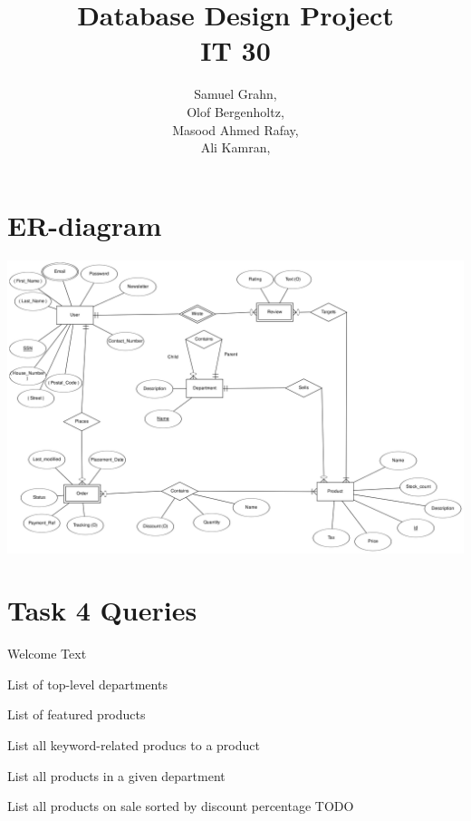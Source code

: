 \documentclass{article}
\title{
  Database Design Project\\
  IT 30
}
\author{
  Samuel Grahn, \email{samuel.grahn@outlook.com}\\
  Olof Bergenholtz, \email{obergenholtz@gmail.com}\\
  Masood Ahmed Rafay, \email{Rafayqureshi2010@gmail.com}\\
  Ali Kamran, \email{alkmrn1@gmail.com}\\
}
\newcommand{\sql}[1]{}
\begin{document}
\maketitle
\newpage
\section*{ER-diagram}
\includegraphics[height=\linewidth,angle=90]{er.png}

\section*{Task 4 Queries}
Welcome Text
\sql{welcome}
List of top-level departments
\sql{topleveldpt}
List of featured products
\sql{featured_products}
List all keyword-related producs to a product
\sql{similar_products}
List all products in a given department
\sql{dept_products}
List all products on sale sorted by discount percentage
TODO
\end{document}
